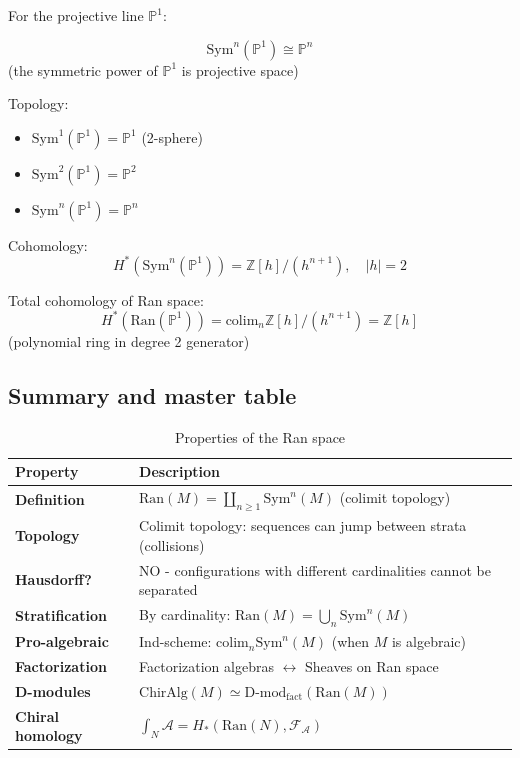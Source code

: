 \begin{example}
\label{ex:ran-P1}
For the projective line $\mathbb{P}^1$:

\[\text{Sym}^n(\mathbb{P}^1) \cong \mathbb{P}^n\]
(the symmetric power of $\mathbb{P}^1$ is projective space)

Topology:
\begin{itemize}
\item $\text{Sym}^1(\mathbb{P}^1) = \mathbb{P}^1$ (2-sphere)
\item $\text{Sym}^2(\mathbb{P}^1) = \mathbb{P}^2$
\item $\text{Sym}^n(\mathbb{P}^1) = \mathbb{P}^n$
\end{itemize}

Cohomology:
\[H^*(\text{Sym}^n(\mathbb{P}^1)) = \mathbb{Z}[h]/(h^{n+1}), \quad |h| = 2\]

Total cohomology of Ran space:
\[H^*(\text{Ran}(\mathbb{P}^1)) = \text{colim}_n \mathbb{Z}[h]/(h^{n+1}) = 
   \mathbb{Z}[h]\]
(polynomial ring in degree 2 generator)
\end{example}

\subsection{Summary and master table}

\begin{table}[H]
\centering
\caption{Properties of the Ran space}
\begin{tabular}{|l|p{8cm}|}
\hline
\textbf{Property} & \textbf{Description} \\
\hline
\textbf{Definition} & $\text{Ran}(M) = \coprod_{n \geq 1} \text{Sym}^n(M)$ 
   (colimit topology) \\
\hline
\textbf{Topology} & Colimit topology: sequences can jump between strata (collisions) \\
\hline
\textbf{Hausdorff?} & NO - configurations with different cardinalities cannot be separated \\
\hline
\textbf{Stratification} & By cardinality: $\text{Ran}(M) = \bigcup_n \text{Sym}^n(M)$ \\
\hline
\textbf{Pro-algebraic} & Ind-scheme: $\text{colim}_n \text{Sym}^n(M)$ (when $M$ is algebraic) \\
\hline
\textbf{Factorization} & Factorization algebras $\leftrightarrow$ Sheaves on Ran space \\
\hline
\textbf{D-modules} & $\text{ChirAlg}(M) \simeq \text{D-mod}_{\text{fact}}(\text{Ran}(M))$ \\
\hline
\textbf{Chiral homology} & $\int_N \mathcal{A} = H_*(\text{Ran}(N), \mathcal{F}_{\mathcal{A}})$ \\
\hline
\end{tabular}
\end{table}
